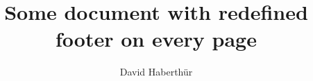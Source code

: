 \documentclass[12pt]{report} %
\title{Some document with redefined footer on every page}
\author{David Haberth\"ur}
\begin{document}
\maketitle
\blinddocument
\end{document}
